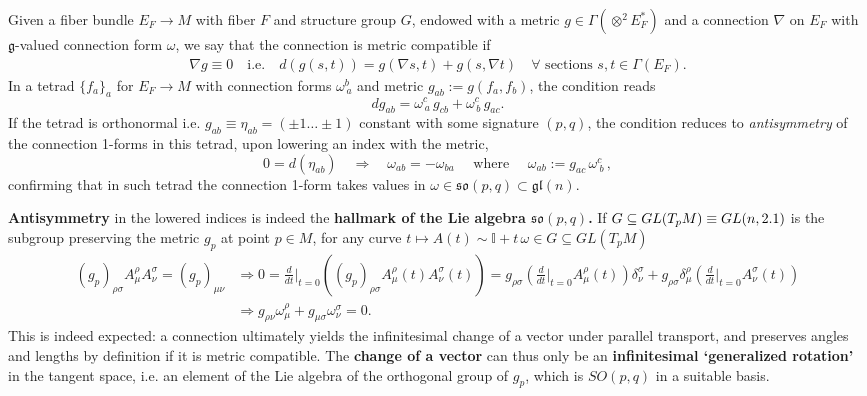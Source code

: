 \begin{mytheorem}
%
Given a fiber bundle $E_F \to M$ with fiber $F$ and structure group $G$, endowed with a metric 
$g\in\Gamma(\otimes^2 E_F^*)$ and a connection $\nabla$ on $E_F$ with $\mathfrak{g}$-valued connection form $\omega$, we say that the connection is metric compatible if 
\begin{align}
    \nabla g \equiv 0\quad \text{i.e.}\quad d \left( g(s,t) \right) = g(\nabla s, t) + g(s, \nabla t)\quad \text{$\forall$ sections }s,t \in \Gamma(E_F).
\end{align}
In a tetrad $\{f_a\}_a$ for $E_F \to M$ with connection forms $\omega_{\,a}^{b}$ and metric $g_{ab} := g(f_a, f_b)$, the condition reads
\begin{equation}
    d g_{ab} = \omega_{\,a}^{c}\, g_{cb} + \omega_{\,b}^{c} \,g_{ac}.
\end{equation}
If the tetrad is orthonormal i.e. $g_{ab} \equiv \eta_{ab}= (\pm1\dots\pm1)$ constant with some signature $(p,q)$, the condition reduces to \emph{antisymmetry} of the connection 1-forms in this tetrad, upon lowering an index with the metric,
\begin{equation}
    0 = d(\eta_{ab})\quad \Rightarrow\quad \omega_{ab} = - \omega_{ba}\quad \text{ where }\quad \omega_{ab} := g_{ac} \, \omega^c_{~b}\,,
\end{equation}
confirming that in such tetrad the connection 1-form takes values in $\omega\in\mathfrak{so}(p,q)\subset \mathfrak{gl}(n)$.

\textbf{Antisymmetry} in the lowered indices is indeed the \textbf{hallmark of the Lie algebra $\mathfrak{so}(p,q)$.}
If $G\subseteq GL(T_pM) \equiv GL(n,2.1)$ is the subgroup preserving the metric $g_p$ at point $p\in M$, for any curve $t\mapsto A(t)\sim\mathbb{I}+t\,\omega \in G\subseteq GL(T_pM)$
{\small
\begin{align}
    (g_p)_{\rho\sigma}A^\rho_\mu A^\sigma_\nu = (g_p)_{\mu\nu}
    &\Rightarrow 0 = \frac{d}{dt} \Big|_{t=0} \left( (g_p)_{\rho\sigma}A^\rho_\mu(t) A^\sigma_\nu(t) \right) = g_{\rho\sigma} \left( \frac{d}{dt} \Big|_{t=0} A^\rho_\mu(t) \right) \delta^\sigma_\nu + g_{\rho\sigma} \delta^\rho_\mu \left( \frac{d}{dt} \Big|_{t=0} A^\sigma_\nu(t) \right) \\
    &\Rightarrow g_{\rho\nu} \omega^\rho_\mu + g_{\mu\sigma} \omega^\sigma_\nu = 0.
\end{align}
}
This is indeed expected: a connection ultimately yields the infinitesimal change of a vector under parallel transport, and preserves angles and lengths by definition if it is metric compatible.
The \textbf{change of a vector} can thus only be an \textbf{infinitesimal `generalized rotation'} in the tangent space, i.e. an element of the Lie algebra of the orthogonal group of $g_p$, which is $SO(p,q)$ in a suitable basis.
\end{mytheorem}


